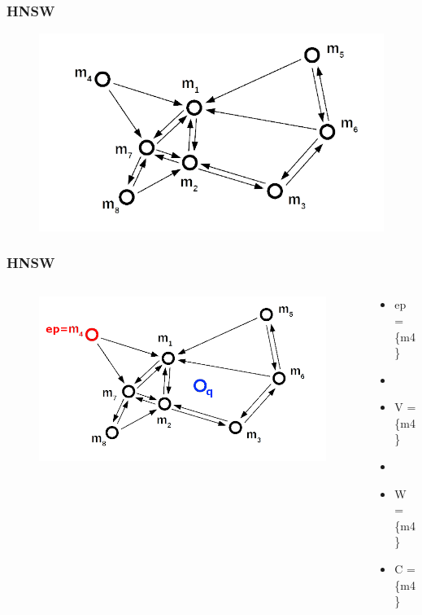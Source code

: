 \documentclass{beamer}
\begin{document}
	\begin{frame}
		\frametitle{HNSW}
		
		\begin{figure}
			\includegraphics[scale=0.34]{figures/HNSW_b1.png}
		\end{figure}
		
	\end{frame}

	\begin{frame}
		\frametitle{HNSW}
		
		\begin{columns}[T] %
			\begin{column}{.6\textwidth}
				\begin{figure}
					\includegraphics[scale=0.3]{figures/HNSW_b2.png}
				\end{figure}
			\end{column}%
			\hfill%
			\begin{column}{.4\textwidth}
				\begin{itemize}
					\item ep = \{m4\}
					\item[]
					\item V = \{m4\}
					\item[]
					\item W = \{m4\}
					\item C = \{m4\}
				\end{itemize}
			\end{column}%
		\end{columns}
		
	\end{frame}
\end{document}
